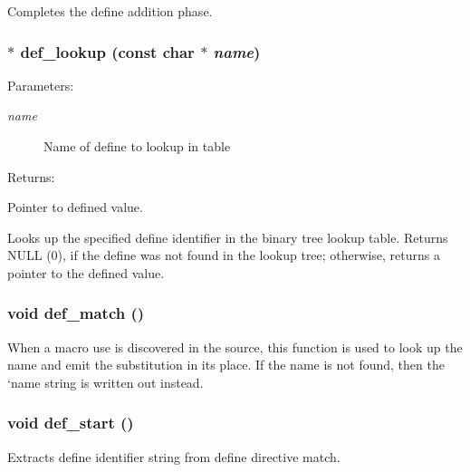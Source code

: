 Completes the define addition phase. 
\subsubsection{$\ast$ def\_\-lookup (const char $\ast$ {\em name})\hspace{0.3cm}{\tt  [static]}}\label{pplexer_8c_a141}


\begin{Desc}
\item[Parameters: ]\par
\begin{description}
\item[{\em 
name}]Name of define to lookup in table\end{description}
\end{Desc}
\begin{Desc}
\item[Returns: ]\par
Pointer to defined value.\end{Desc}
Looks up the specified define identifier in the binary tree lookup table. Returns NULL (0), if the define was not found in the lookup tree; otherwise, returns a pointer to the defined value. 
\subsubsection{\setlength{\rightskip}{0pt plus 5cm}void def\_\-match ()\hspace{0.3cm}{\tt  [static]}}\label{pplexer_8c_a130}


When a macro use is discovered in the source, this function is used to look up the name and emit the substitution in its place. If the name is not found, then the `name string is written out instead. 
\subsubsection{\setlength{\rightskip}{0pt plus 5cm}void def\_\-start ()\hspace{0.3cm}{\tt  [static]}}\label{pplexer_8c_a131}


Extracts define identifier string from define directive match. 
